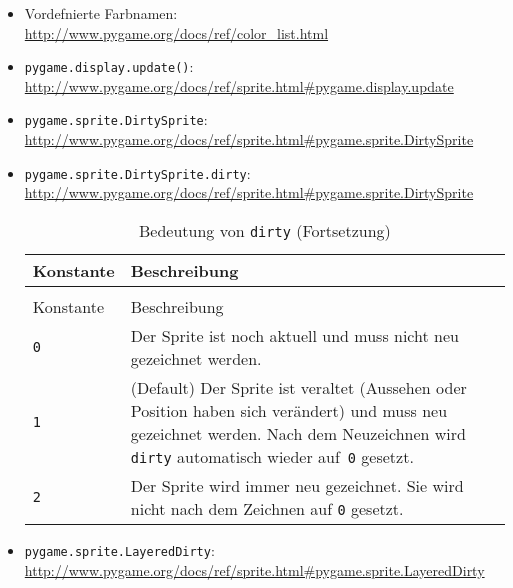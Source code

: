 \begin{itemize}
	\item Vordefnierte Farbnamen:\\ 
	\url{http://www.pygame.org/docs/ref/color_list.html}

	\item\texttt{pygame.display.update()}:
	\\ \url{http://www.pygame.org/docs/ref/sprite.html#pygame.display.update}

	\item\texttt{pygame.sprite.DirtySprite}:
	\\ \url{http://www.pygame.org/docs/ref/sprite.html#pygame.sprite.DirtySprite}

	\item\texttt{pygame.sprite.DirtySprite.dirty}:
	\\ \url{http://www.pygame.org/docs/ref/sprite.html#pygame.sprite.DirtySprite}\\
	\begin{longtable}{lp{12cm}}
	\caption{Bedeutung von \texttt{dirty}}\label{tabDirty} \\
	Konstante & Beschreibung \\\hline\hline
	\hline
	\endfirsthead %
	\caption{Bedeutung von \texttt{dirty} (Fortsetzung)}\\
	Konstante & Beschreibung \\\hline\hline
	\hline
	\endhead %
	\texttt{0}  & Der Sprite ist noch aktuell und muss nicht neu gezeichnet werden.\\ \hline
	\texttt{1}  & (Default) Der Sprite ist veraltet (Aussehen oder Position haben sich verändert) und muss neu gezeichnet werden. Nach dem Neuzeichnen wird \texttt{dirty} automatisch wieder auf~\texttt{0} gesetzt. \\ \hline
	\texttt{2}  & Der Sprite wird immer neu gezeichnet. Sie wird nicht nach dem Zeichnen auf \texttt{0} gesetzt.\\ \hline
    \end{longtable} 

	\item \texttt{pygame.sprite.LayeredDirty}:
	\\ \url{http://www.pygame.org/docs/ref/sprite.html#pygame.sprite.LayeredDirty}
	

\end{itemize}

